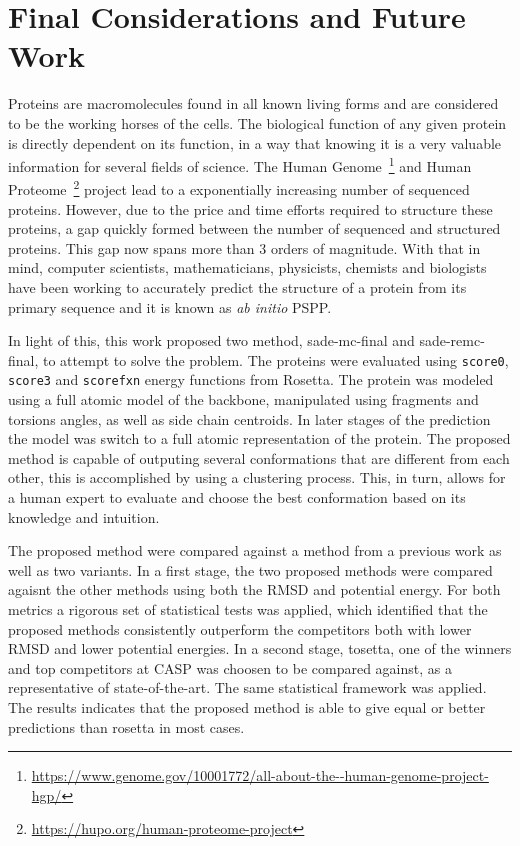 \chapter{Final Considerations and Future Work}
\label{chap:final_considerations}

Proteins are macromolecules found in all known living forms and are
considered to be the working horses of the cells. The biological
function of any given protein is directly dependent on its
function, in a way that knowing it is a very valuable information
for several fields of science. The Human
Genome~\footnote{\url{https://www.genome.gov/10001772/all-about-the--human-genome-project-hgp/}}
and Human Proteome~\footnote{\url{https://hupo.org/human-proteome-project}} project
lead to a exponentially increasing number of sequenced proteins.
However, due to the price and time efforts required to structure
these proteins, a gap quickly formed between the number of sequenced
and structured proteins. This gap now spans more than 3 orders
of magnitude. With that in mind, computer scientists, mathematicians,
physicists, chemists and biologists have been working to accurately
predict the structure of a protein from its primary
sequence and it is known as \textit{ab initio} PSPP.

In light of this, this work proposed two method, sade-mc-final and
sade-remc-final, to attempt to solve the problem. The proteins were evaluated
using \texttt{score0}, \texttt{score3} and \texttt{scorefxn} energy functions
from Rosetta. The protein was modeled using a full atomic model of the backbone,
manipulated using fragments and torsions angles, as well as side chain centroids.
In later stages of the prediction the model was switch to a full atomic
representation of the protein. The proposed method is capable of outputing
several conformations that are different from each other, this is accomplished
by using a clustering process. This, in turn, allows for a human expert to
evaluate and choose the best conformation based on its knowledge and intuition.

The proposed method were compared against a method from a previous work as
well as two variants. In a first stage, the two proposed methods were compared
agaisnt the other methods using both the RMSD and potential energy. For both
metrics a rigorous set of statistical tests was applied, which identified that
the proposed methods consistently outperform the competitors both with lower
RMSD and lower potential energies. In a second stage, tosetta, one of the
winners and top competitors at CASP was choosen to be compared against, as a
representative of state-of-the-art. The same statistical framework was applied.
The results indicates that the proposed method is able to give equal or better
predictions than rosetta in most cases.

